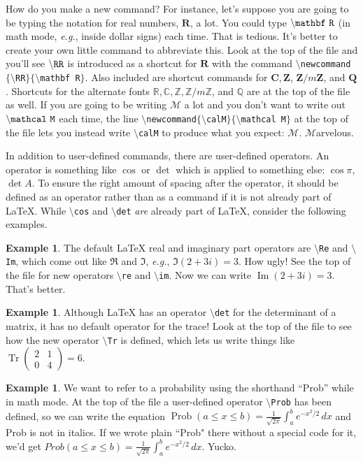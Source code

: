 \documentclass[12pt,letterpaper]{amsart}
\newcommand{\RR}{\mathbf R}  %
\newcommand{\CC}{\mathbf C}  %
\newcommand{\ZZ}{\mathbf Z}   %
\newcommand{\QQ}{\mathbf Q}   %
\newcommand{\rr}{\mathbb R}     %
\newcommand{\cc}{\mathbb C}    %
\newcommand{\zz}{\mathbb Z}    %
\newcommand{\qq}{\mathbb Q}   %
\newcommand{\ZZn}[1]{\ZZ/{#1}\ZZ}
\newcommand{\zzn}[1]{\zz/{#1}\zz}
\newcommand{\calM}{\mathcal M}  %
\newcommand{\sm}{\setminus}
\newcommand{\pln}[1]{$\sm${\tt #1}}
\newcommand{\Tr}{\operatorname {Tr}}
\newcommand{\Prob}{\operatorname {Prob}}
\newcommand{\im}{\operatorname {Im}}   %
\theoremstyle{plain}
\theoremstyle{definition}
\newtheorem{example}[theorem]{Example}
\numberwithin{equation}{section}
\begin{document}
How do you make a new command?  For instance, 
let's suppose you are going to be typing 
the notation for real numbers, $\RR$, a lot.  
You could type $\tt {\sm}mathbf \ R$ 
(in math mode, {\it e.g.}, inside dollar signs) 
each time.  That is tedious.  It's better to 
create your own little command to abbreviate this. 
Look at the top of the file and you'll see 
$\tt {\sm}RR$ is introduced as a shortcut for $\RR$ 
with the command 
{\tt $\sm$newcommand$\{\sm$RR$\}\{\sm$mathbf R$\}$}. 
Also included are
shortcut commands for $\CC, \ZZ$, $\ZZn{m}$, and $\QQ$. 
Shortcuts for the alternate fonts 
$\rr, \cc, \zz, \zzn{m}$, and $\qq$ are at the top of the file as well. 
If you are going to be writing $\mathcal M$ a  
lot and you don't want to write out $\tt {\sm}mathcal \ M$
each time, 
the line 
{\tt $\sm$newcommand$\{\sm$calM$\}\{\sm$mathcal M$\}$}
at the top of the file 
lets you instead write 
{\tt $\sm$calM} to produce 
what you expect: $\calM$.  $\calM$arvelous.



In addition to user-defined commands, there are 
user-defined operators. An operator is something 
like $\cos$ or $\det$ which 
is applied to something else: $\cos \pi$, 
$\det A$. To ensure the right amount of spacing 
after the operator, it should be defined as an operator 
rather than as a command if it is not already part of LaTeX.
While {\tt $\sm$cos} and {\tt $\sm$det} {\it are} already part of LaTeX, 
consider the following examples.

\begin{example}
The default LaTeX real and imaginary part operators 
are 
\pln{Re} and \pln{Im}, 
which come out like 
$\Re$ and $\Im$, {\it e.g.}, $\Im(2+3i) = 3$.  How ugly!  
See the top of the file for new operators 
\pln{re} and \pln{im}. 
Now we can write $\im(2+3i) = 3$.  That's better.
\end{example}

\begin{example}
Although 
LaTeX has an operator 
\pln{det} 
for the determinant of a matrix, 
it has no default operator for the trace! 
Look at the top of the file to see how the new operator 
\pln{Tr} is defined, which lets us write things like 
$\Tr (\begin{smallmatrix}2&1\\0&4\end{smallmatrix}) = 6$.
\end{example}


\begin{example}
We want to refer to a probability using the shorthand ``Prob'' 
while in math mode.  At the top of the file a user-defined 
operator 
\pln{Prob} 
has been defined, so we can write the equation 
$\Prob(a \leq x \leq b) = \frac{1}{\sqrt{2\pi}}\int_a^b e^{-x^2/2}\,dx$ 
and Prob is not in italics.  If we wrote plain ``Prob" there 
without a special code for it, we'd get
$Prob(a \leq x \leq b) = \frac{1}{\sqrt{2\pi}}\int_a^b e^{-x^2/2}\,dx$. 
Yucko.
\end{example}
\end{document}
